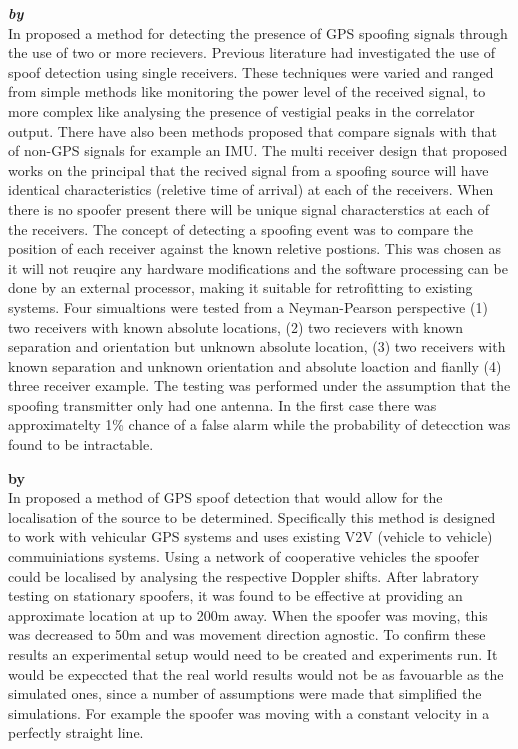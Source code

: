 \textbf{\emph{ by \citeauthor{RN10}}} \\
In \citeyear{RN10} \citeauthor{RN10} \cite{RN10} proposed a method for detecting the presence of GPS spoofing signals through the use of two or more recievers. 
Previous literature had investigated the use of spoof detection using single receivers. These techniques were varied and ranged from simple methods like monitoring the 
power level of the received signal, to more complex like analysing the presence of vestigial peaks in the correlator output. There have also been methods proposed
that compare signals with that of non-GPS signals for example an IMU. 
The multi receiver design that \citeauthor{RN10} proposed works on the principal that the recived signal from a spoofing source will have identical characteristics (reletive time of arrival)
at each of the receivers. When there is no spoofer present there will be unique signal characterstics at each of the receivers.
The concept of detecting a spoofing event was to compare the position of each receiver against the known reletive postions. This was chosen as it will not reuqire any 
hardware modifications and the software processing can be done by an external processor, making it suitable for retrofitting to existing systems.
Four simualtions were tested from a Neyman-Pearson perspective  (1) two receivers with known absolute locations, (2) two recievers with known separation and orientation but unknown absolute location, 
(3) two receivers with known separation and unknown orientation and absolute loaction and fianlly (4) three receiver example. The testing was performed under the assumption
that the spoofing transmitter only had one antenna.
In the first case there was approximatelty 1\% chance of a false alarm while the probability of detecction was found to be intractable.

\medskip

\textbf{\emph{} by \citeauthor{RN1}} \\
In \citeyear{RN1} \citeauthor{RN1} \cite{RN1} proposed a method of GPS spoof detection that would allow for the localisation
of the source to be determined. Specifically this method is designed to work with vehicular GPS systems and uses existing 
V2V (vehicle to vehicle) commuiniations systems. Using a network of cooperative vehicles the spoofer could be localised by analysing the respective
Doppler shifts. After labratory testing on stationary spoofers, it was found to be effective at providing an approximate location at up to 200m away.
When the spoofer was moving, this was decreased to 50m and was movement direction agnostic. To confirm these results an experimental setup would need
to be created and experiments run. It would be expeccted that the real world results would not be as favouarble as the simulated ones, since a number of
assumptions were made that simplified the simulations. For example the spoofer was moving with a constant velocity in a perfectly straight line.

